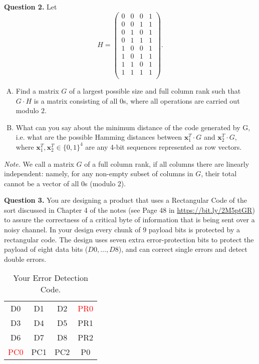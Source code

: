 \documentclass[jou]{apa6}
\begin{document}
\vspace{10pt}
{\bf Question 2.} 
Let
{\footnotesize
$$H = \left( \begin{array}{cccc}
0 & 0 & 0 & 1 \\
0 & 0 & 1 & 1 \\
0 & 1 & 0 & 1 \\ 
0 & 1 & 1 & 1 \\
1 & 0 & 0 & 1 \\
1 & 0 & 1 & 1 \\
1 & 1 & 0 & 1 \\
1 & 1 & 1 & 1 \\
\end{array} \right).$$
}

\begin{enumerate}[(A)]
\item 
Find a matrix $G$ of a largest possible size and full column rank such that $G \cdot H$ is a matrix 
consisting of all $0$s, where all operations are carried out modulo $2$.
\item What can you say about the minimum distance of the code generated by G, i.e.
what are the possible Hamming distances between $\mathbf{x}_1^T \cdot G$ and $\mathbf{x}_2^T \cdot G$, where
$\mathbf{x}_1^T, \mathbf{x}_2^T \in \{ 0,1 \}^4$ are any 4-bit sequences
represented as row vectors.
\end{enumerate}

{\em Note.} We call a matrix $G$ of a full column rank, if all columns there are linearly independent: 
namely, for any non-empty subset of columns in $G$, their total cannot be a vector of all $0$s (modulo $2$).

\vspace{10pt}
{\bf Question 3.} 
You are designing a product that uses a Rectangular Code of the sort discussed in Chapter 4 of the notes
(see Page 48 in \url{https://bit.ly/2M5ptGR}) to
assure the correctness of a critical byte of information that is being sent over a noisy channel. 
In your design every chunk of $9$ payload bits
is protected by a rectangular code. 
The design uses seven
extra error-protection bits to protect the payload of eight data bits ($D0,\ldots,D8$), 
and can correct single errors and detect double errors.


\begin{table}[h]
\begin{center}
\begin{tabular}{cccc}
D0 & D1 & D2 & \textcolor{red}{PR0} \\
D3 & D4 & D5 & PR1 \\
D6 & D7 & D8 & PR2 \\
\textcolor{red}{PC0} & PC1 & PC2 & P0 \\
\end{tabular}
\caption{\label{tab:rectangular}Your Error Detection Code.}
\end{center}
\end{table}
\end{document}
